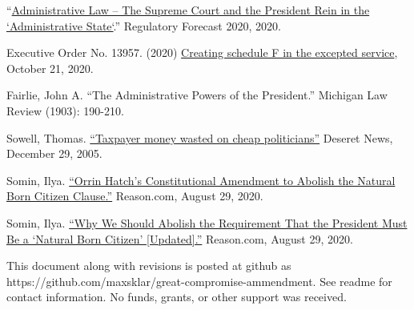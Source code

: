 \documentclass{article}
\newcommand{\quotes}[1]{``#1''}
\begin{document}
\begin{thebibliography}{20}
\quotes{\href{https://www.crowell.com/a/web/bomv5ATK9LZPNrBA51skWq/4TtiyY/Regulatory-Forecast-2020-Administrative-Law-Crowell-Moring.pdf }{Administrative Law – The Supreme Court and the President Rein in the `Administrative State`}.} Regulatory Forecast 2020, 2020. 

Executive Order No. 13957. (2020) \href{https://www.
federalregister.gov/documents/2020/10/26/2020-23780/creating-schedule-f-in-the-excepted-service}{Creating schedule F in the excepted service}, October 21, 2020.

Fairlie, John A. \quotes{The Administrative Powers of the President.} Michigan Law Review (1903): 190-210.

Sowell, Thomas. \href{https://www.deseret.com/2005/12/29/19930084/thomas-sowell-taxpayer-money-wasted-on-cheap-politicians}{\quotes{Taxpayer money wasted on cheap politicians}} Deseret News, December 29, 2005.

Somin, Ilya. \href{https://reason.com/volokh/2020/08/16/orrin-hatchs-constitutional-amendment-to-abolish-the-natural-born-citizen-clause/}{\quotes{Orrin Hatch’s Constitutional Amendment to Abolish the Natural Born Citizen Clause.}} Reason.com, August 29, 2020.

Somin, Ilya. \href{https://reason.com/volokh/2020/08/14/why-we-should-abolish-the-requirement-that-the-president-must-be-a-natural-born-citizen/}{\quotes{Why We Should Abolish the Requirement That the President Must Be a ‘Natural Born Citizen’ [Updated].}} Reason.com, August 29, 2020. 

\end{thebibliography}

This document along with revisions is posted at github as https://github.com/maxsklar/great-compromise-ammendment. See readme for contact information. No funds, grants, or other support was received.
\end{document}
